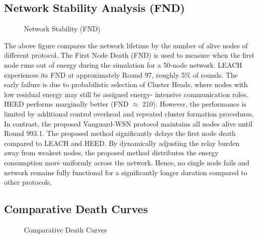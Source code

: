 \documentclass[conference]{IEEEtran}
\begin{document}
\subsection{Network Stability Analysis (FND)}

\begin{figure}[htbp]
\centerline{}
\caption{Network Stability (FND)}
\label{fig4}
\end{figure}

The above figure compares the network lifetime by the number of alive nodes of different protocol. The First Node Death (FND) is used to measure when the first node runs out of energy during the simulation for a 50-node network. LEACH experiences its FND at approximately Round 97, roughly 5\% of rounds. The early failure is due to probabilistic selection of Cluster Heads, where nodes with low residual energy may still be assigned energy- intensive communication roles. HEED performs marginally better (FND $\approx$ 210). However, the performance is limited by additional control overhead and repeated cluster formation procedures.
In contrast, the proposed Vanguard-WSN protocol maintains all nodes alive until Round 993.1. The proposed method significantly delays the first node death compared to LEACH and HEED. By dynamically adjusting the relay burden away from weakest nodes, the proposed method distributes the energy consumption more uniformly across the network. Hence, no single node fails and network remains fully functional for a significantly longer duration compared to other protocols.

\subsection{Comparative Death Curves}

\begin{figure}[htbp]
\centerline{}
\caption{Comparative Death Curves}
\label{fig5}
\end{figure}
\end{document}
